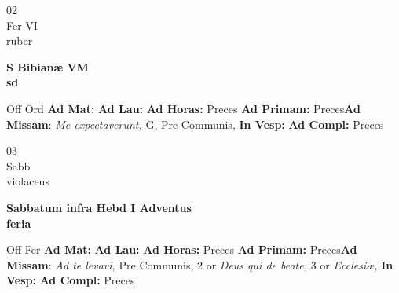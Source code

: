 \documentclass[10pt, openany]{book}
\begin{document}
    \begin{center}
        \begin{minipage}{3.5in}
            \vspace{2em}
            \begin{minipage}{0.5in}
                {\Huge 02} \\
                {\normalsize Fer VI} \\
                {\normalsize ruber}
            \end{minipage}
            \begin{minipage}{3.0in}
                \textbf{ \large S Bibianæ VM \\
                \textnormal{\normalsize sd}} \\ 
            \end{minipage}
            \begin{justify}Off Ord
                \textbf{Ad Mat: }
                \textbf{Ad Lau: }
                \textbf{Ad Horas: }Preces
                \textbf{Ad Primam: }Preces\textbf{Ad Missam}: \textit{Me expectaverunt,} G, Pre Communis,  
                \textbf{In Vesp: }
                \textbf{Ad Compl: }Preces
            \end{justify}
        \end{minipage}
    \end{center}

    \begin{center}
        \begin{minipage}{3.5in}
            \vspace{2em}
            \begin{minipage}{0.5in}
                {\Huge 03} \\
                {\normalsize Sabb} \\
                {\normalsize violaceus}
            \end{minipage}
            \begin{minipage}{3.0in}
                \textbf{ \large Sabbatum infra Hebd I Adventus \\
                \textnormal{\normalsize feria}} \\ 
            \end{minipage}
            \begin{justify}Off Fer
                \textbf{Ad Mat: }
                \textbf{Ad Lau: }
                \textbf{Ad Horas: }Preces
                \textbf{Ad Primam: }Preces\textbf{Ad Missam}: \textit{Ad te levavi,} Pre Communis, 2 or \textit{Deus qui de beate,} 3 or \textit{Ecclesiæ,}  
                \textbf{In Vesp: }
                \textbf{Ad Compl: }Preces
            \end{justify}
        \end{minipage}
    \end{center}
\end{document}
